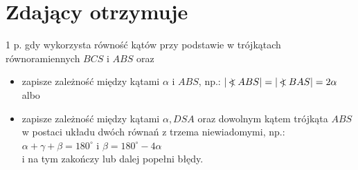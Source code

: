 \documentclass[10pt]{article}
\newcommand\Varangle{\mathop{{<\!\!\!\!\!\text{\small)}}\:}\nolimits}
\begin{document}
\section*{Zdający otrzymuje}
 1 p. gdy wykorzysta równość kątów przy podstawie w trójkątach równoramiennych $B C S$ i $A B S$ oraz\begin{itemize}
  \item zapisze zależność między kątami $\alpha$ i $A B S$, np.: $|\Varangle A B S|=|\Varangle B A S|=2 \alpha$\\
albo
  \item zapisze zależność między kątami $\alpha, D S A$ oraz dowolnym kątem trójkąta $A B S$ w postaci układu dwóch równań z trzema niewiadomymi, np.: $\alpha+\gamma+\beta=180^{\circ}$ i $\beta=180^{\circ}-4 \alpha$\\
i na tym zakończy lub dalej popełni błędy.
\end{itemize}
\end{document}

